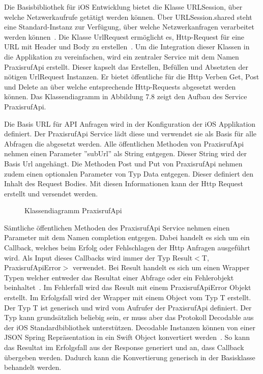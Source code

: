 Die Basisbibliothek für iOS Entwicklung bietet die Klasse URLSession, über welche Netzwerkaufrufe getätigt werden können.
Über URLSession.shared steht eine Standard-Instanz zur Verfügung, über welche Netzwerkanfragen verarbeitet werden können~\cite{ios_urlsession}.
Die Klasse UrlRequest ermöglicht es, Http-Request für eine URL mit Header und Body zu erstellen~\cite{ios_urlrequest}.
Um die Integration dieser Klassen in die Applikation zu vereinfachen, wird ein zentraler Service mit dem Namen PraxisrufApi erstellt.
Dieser kapselt das Erstellen, Befüllen und Absetzten der nötigen UrlRequest Instanzen.
Er bietet öffentliche für die Http Verben Get, Post und Delete an über welche entsprechende Http-Requests abgesetzt werden können.
Das Klassendiagramm in Abbildung 7.8 zeigt den Aufbau des Service PraxisrufApi\@.

Die Basis URL für API Anfragen wird in der Konfiguration der iOS Applikation definiert.
Der PraxisrufApi Service lädt diese und verwendet sie als Basis für alle Abfragen die abgesetzt werden.
Alle öffentlichen Methoden von PraxisrufApi nehmen einen Parameter ''subUrl'' als String entgegen.
Dieser String wird der Basis Url angehängt.
Die Methoden Post und Put von PraxisrufApi nehmen zudem einen optionalen Parameter von Typ Data entgegen.
Dieser definiert den Inhalt des Request Bodies.
Mit diesen Informationen kann der Http Request erstellt und versendet werden.

\begin{figure}[h]
    \centering
    \begin{minipage}[b]{0.8\textwidth}
        \caption{Klassendiagramm PraxisrufApi}
    \end{minipage}
\end{figure}

Sämtliche öffentlichen Methoden des PraxisrufApi Service nehmen einen Parameter mit dem Namen completion entgegen.
Dabei handelt es sich um ein Callback, welches beim Erfolg oder Fehlschlagen der Http Anfragen ausgeführt wird.
Als Input dieses Callbacks wird immer der Typ Result$<$T, PraxisrufApiError$>$ verwendet.
Bei Result handelt es sich um einen Wrapper Typen welcher entweder das Resultat einer Abfrage oder ein Fehlerobjekt beinhaltet~\cite{ios_result}.
Im Fehlerfall wird das Result mit einem PraxisrufApiError Objekt erstellt.
Im Erfolgsfall wird der Wrapper mit einem Object vom Typ T erstellt.
Der Typ T ist generisch und wird vom Aufrufer der PraxisrufApi definiert.
Der Typ kann grundsätzlich beliebig sein, er muss aber das Protokoll Decodable aus der iOS Standardbibliothek unterstützen.
Decodable Instanzen können von einer JSON Spring Repräsentation in ein Swift Object konvertiert werden~\cite{ios_decodable}.
So kann das Resultat im Erfolgsfall aus der Response generiert und an, dass Callback übergeben werden.
Dadurch kann die Konvertierung generisch in der Basisklasse behandelt werden.

